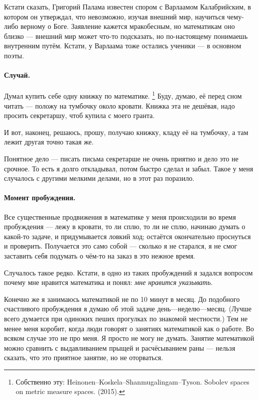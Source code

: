 \documentclass{book}
\begin{document}
Кстати сказать, Григорий Палама известен спором с Варлаамом Калабрийским, в котором он утверждал, что невозможно, изучая внешний мир, научиться чему-либо верному о Боге.
Заявление кажется мракобесным, но математикам оно близко --- внешний мир может что-то подсказать, но по-настоящему понимаешь внутренним путём.
Кстати, у Варлаама тоже остались ученики --- в основном поэты.

\paragraph{Случай.}
Думал купить себе одну книжку по математике.%
\footnote{Собственно эту: Heinonen--Koskela--Shanmugalingam--Tyson.
Sobolev spaces on metric measure spaces. (2015).}
Буду, думаю, её перед сном читать --- положу на тумбочку около кровати.
Книжка эта не дешёвая, надо просить секретаршу, чтоб купила с моего гранта.

И вот, наконец, решаюсь, прошу, получаю книжку, кладу её на тумбочку, а там лежит другая точно такая же.

Понятное дело --- писать письма секретарше не очень приятно и дело это не срочное.
То есть я долго откладывал, потом быстро сделал и забыл.
Такое у меня случалось с другими мелкими делами, но в этот раз поразило.

\paragraph{Момент пробуждения.}
Все существенные продвижения в математике у меня происходили во время пробуждения ---
лежу в кровати, то ли сплю, то ли не сплю, начинаю думать о какой-то задаче, и придумывается ловкий ход; 
остаётся окончательно проснуться и проверить.
Получается это само собой --- сколько я не старался, я не смог заставить себя подумать о чём-то на заказ в это нежное время.

Случалось такое редко.
Кстати, в одно из таких пробуждений я задался вопросом почему мне нравится математика и понял: \textit{мне нравится указывать}.

Конечно же я занимаюсь математикой не по 10 минут в месяц.
До подобного счастливого пробуждения я думаю об этой задаче день---неделю---месяц.
(Лучше всего думается при одиноких пеших прогулках по знакомой местности.)
Тем не менее меня коробит, когда люди говорят о занятиях математикой как о работе.
Во всяком случае это не про меня.
Я просто не могу не думать.
Занятие математикой можно сравнить с выдавливанием прыщей и расчёсыванием раны --- нельзя сказать, что это приятное занятие, но не оторваться.
\end{document}

